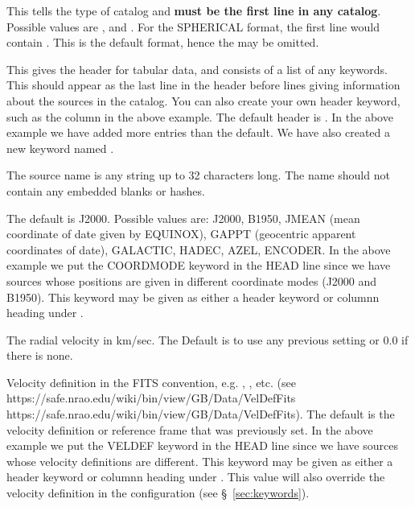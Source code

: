\newpage
\begin{description}[leftmargin=*,font=\bfseries\large]
\item[FORMAT] This tells the type of catalog and {\bf must be the first
line in any catalog}. Possible values are ,  
and .  For the SPHERICAL format, the first line would 
contain . This is the default format, hence the 
 may be omitted.

\item[HEAD] This gives the header for tabular data,
and consists of a list of any keywords. This should appear as the last
line in the header before lines giving information about the sources in
the catalog.  You can also create your own header keyword, such as the
 column in the above example.  The default header is
. In the above example we have added
more entries than the default.  We have also created a new keyword named
.

\item[NAME] The source name is any string up to 32 characters long.
The name should not contain any embedded blanks or hashes.

\item[COORDMODE] The default is J2000. Possible values are:
J2000, B1950, JMEAN (mean coordinate of date given by EQUINOX), GAPPT 
(geocentric apparent coordinates of date), GALACTIC, HADEC, AZEL, ENCODER.
In the above example we put the COORDMODE keyword in the HEAD line since
we have sources whose positions are given in different coordinate modes
(J2000 and B1950).  This keyword may be given as either a header keyword
or columnn heading under .

\item[VEL \textnormal{or} VELOCITY] The radial velocity in km/sec. 
The Default is to use any previous setting or 0.0 if there is none.

\item[VELDEF] Velocity definition in the FITS convention, e.g. 
, , etc.
(see \htmladdnormallink
{https://safe.nrao.edu/wiki/bin/view/GB/Data/VelDefFits}
{https://safe.nrao.edu/wiki/bin/view/GB/Data/VelDefFits}).
The default is the velocity definition or reference frame that was previously set.
In the above example we put the VELDEF keyword in the HEAD line since we have
sources whose velocity definitions are different. This keyword may be given as
either a header keyword or columnn heading under . This value will
also override the velocity definition in the configuration (see \S~\ref{sec:keywords}).


\end{description}
